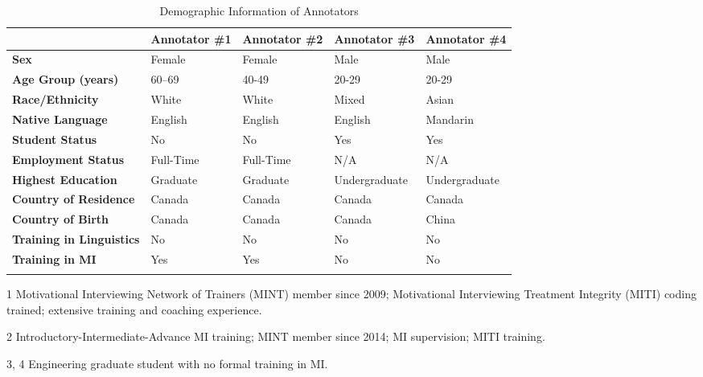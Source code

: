 \renewcommand{\arraystretch}{1.1} %

\begin{table}[!ht]
\centering
\begin{threeparttable}
\caption{Demographic Information of Annotators}
\label{tab:annotator-demographics}
\begin{tabular}{%
  @{}p{}
  p{}
  p{}
  p{}
  p{}@{}}
\toprule
 & \textbf{Annotator \#1\tnote{1}} 
 & \textbf{Annotator \#2\tnote{2}} 
 & \textbf{Annotator \#3\tnote{3, 4}}
 & \textbf{Annotator \#4\tnote{3, 4}} \\
\midrule
\arrayrulecolor{gray!50} 
\textbf{Sex} & Female & Female & Male & Male\\
\hline
\textbf{Age Group (years)} & 60--69 & 40-49 & 20-29 &20-29 \\
\hline
\textbf{Race/Ethnicity} & White & White & Mixed & Asian\\
\hline
\textbf{Native Language} & English & English & English & Mandarin\\
\hline
\textbf{Student Status} & No & No & Yes & Yes\\
\hline
\textbf{Employment Status} & Full-Time & Full-Time & N/A & N/A\\
\hline
\textbf{Highest Education} & Graduate & Graduate & Undergraduate & Undergraduate \\
\hline
\textbf{Country of Residence} & Canada & Canada & Canada & Canada\\
\hline
\textbf{Country of Birth} & Canada & Canada & Canada & China\\
\hline
\textbf{Training in Linguistics} & No & No & No& No\\
\hline
\textbf{Training in MI} & Yes & Yes & No & No\\
\arrayrulecolor{black}
\bottomrule
\end{tabular}

\begin{tablenotes}
\footnotesize
\item[1] 
 Motivational Interviewing Network of Trainers (MINT) member since 2009; 
 Motivational Interviewing Treatment Integrity (MITI) coding trained; extensive training 
 and coaching experience.
\item[2]
 Introductory-Intermediate-Advance MI training;
 MINT member since 2014;
 MI supervision; MITI training.
 \item[3, 4]
 Engineering graduate student with no formal training in MI.
\end{tablenotes}

\end{threeparttable}
\end{table}
